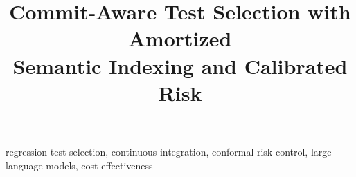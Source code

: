 \documentclass[10pt,conference]{IEEEtran}
\begin{document}
\title{Commit-Aware Test Selection with Amortized\\
Semantic Indexing and Calibrated Risk}

\author{
}

\maketitle

\begin{abstract}

\end{abstract}

\begin{IEEEkeywords}
regression test selection, continuous integration, conformal risk control, large language models, cost-effectiveness
\end{IEEEkeywords}













\end{document}
